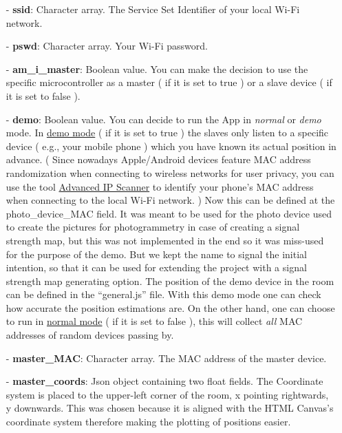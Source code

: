 \documentclass[11pt,a4paper]{article}
\begin{document}
\begin{itemize}
\setlength{\itemsep}{0pt}
\setlength{\parsep}{0pt}
\setlength{\parskip}{0pt}

\item[-] \textbf{ssid}: Character array. The Service Set Identifier of your local Wi-Fi network.\\

\item[-] \textbf{pswd}: Character array. Your Wi-Fi password.\\

\item[-] \textbf{am\_i\_master}:  Boolean value. You can make the decision to use the specific microcontroller as a master ( if it is set to true ) or a slave device ( if it is set to false ).

\newpage

\item[-] \textbf{demo}: Boolean value. You can decide to run the App in \emph{normal} or \emph{demo} mode. In \underline{demo mode} ( if it is set to true ) the slaves only listen to a specific device ( e.g., your mobile phone ) which you have known its actual position in advance. ( Since nowadays Apple/Android devices feature MAC address randomization when connecting to wireless networks for user privacy, you can use the tool \href{https://www.advanced-ip-scanner.com/}{Advanced IP Scanner} to identify your phone's MAC address when connecting to the local Wi-Fi network. ) Now this can be defined at the photo\_device\_MAC field. It was meant to be used for the photo device used to create the pictures for photogrammetry in case of creating a signal strength map, but this was not implemented in the end so it was miss-used for the purpose of the demo. But we kept the name to signal the initial intention, so that it can be used for extending the project with a signal strength map generating option. The position of the demo device in the room can be defined in the ``general.js'' file. With this demo mode one can check how accurate the position estimations are. On the other hand, one can choose to run in \underline{normal mode} ( if it is set to false ), this will collect \emph{all} MAC addresses of random devices passing by.\\

\item[-] \textbf{master\_MAC}: Character array. The MAC address of the master device.\\

\item[-] \textbf{master\_coords}: Json object containing two float fields. The Coordinate system is placed to the upper-left corner of the room, x pointing rightwards, y downwards. This was chosen because it is aligned with the HTML Canvas's coordinate system therefore making the plotting of positions easier.\\


\end{itemize}
\end{document}
